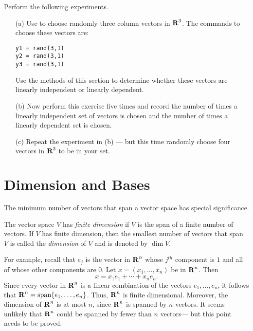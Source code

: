 \documentclass{ximera}
\begin{document}
\begin{exercise} \label{c5.4.9}
Perform the following experiments.
\begin{itemize}
\item[(a)]   Use \Matlab to choose randomly three column vectors in
$\mbox{$\bf{R}$}^3$.  The \Matlab commands to choose these vectors are:
\begin{verbatim}
y1 = rand(3,1)
y2 = rand(3,1)
y3 = rand(3,1)
\end{verbatim}
Use the methods of this section to determine whether these vectors
are linearly independent or linearly dependent.
\item[(b)]  Now perform this exercise five times and record the number
of times a linearly independent set of vectors is chosen and the
number of times a linearly dependent set is chosen.
\item[(c)]  Repeat the experiment in (b) --- but this time randomly
choose four vectors in $\mbox{$\bf{R}$}^3$ to be in your set.
\end{itemize}
\end{exercise}

\section{Dimension and Bases} \label{S:5.5}

The minimum number of vectors that span a vector space has special
significance.

\begin{Def}
The vector space $V$ has {\em finite dimension\/} if $V$ is the
span of a finite number of vectors.  If $V$ has finite dimension, then the
smallest number of vectors that span $V$ is called the {\em dimension\/} of
$V$ and is denoted by $\dim V$.
\end{Def}  

For example, recall that $e_j$ is the vector in $\mbox{$\bf{R}$}^n$ whose $j^{th}$
component is $1$ and all of whose other components are $0$.
Let $x=(x_1,\ldots,x_n)$ be in $\mbox{$\bf{R}$}^n$. Then
\begin{equation}  \label{e:spanrn}
x =  x_1e_1 + \cdots + x_ne_n.
\end{equation}
Since every vector in $\mbox{$\bf{R}$}^n$ is a linear combination of the
vectors $e_1,\ldots,e_n$, it follows that
$\mbox{$\bf{R}$}^n={\rm span}\{e_1,\ldots,e_n\}$.  Thus, $\mbox{$\bf{R}$}^n$ is finite
dimensional.  Moreover, the dimension of $\mbox{$\bf{R}$}^n$ is at most $n$,
since $\mbox{$\bf{R}$}^n$ is spanned by $n$ vectors. It seems unlikely that
$\mbox{$\bf{R}$}^n$ could be spanned by fewer than $n$ vectors--- but this
point needs to be proved.
\end{document}
